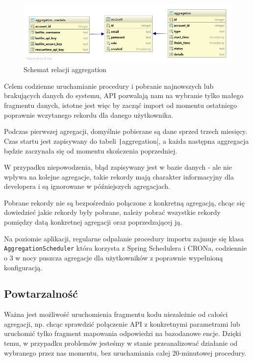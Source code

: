 \documentclass[openright]{xmgr}
\begin{document}
            \begin{figure}
                \centering
                \includegraphics[width=\textwidth]{fig/db-aggregation.png}
                \caption{Schemat relacji aggregation}
                \label{fig:db-aggregation}
            \end{figure}

            Celem codzienne uruchamianie procedury i pobranie najnowszych lub brakujących danych do systemu,
            API pozwalają nam na wybranie tylko małego fragmentu danych, istotne jest więc by zacząć import
            od momentu ostatniego poprawnie wczytanego rekordu dla danego użytkownika.

            Podczas pierwszej agregacji, domyślnie pobierane są dane sprzed trzech miesięcy.
            Czas startu jest zapisywany do tabeli \texttt|aggregation|,
            a każda następna aggregacja będzie zaczynała się od momentu skończenia poprzedniej.

            W przypadku niepowodzenia, błąd zapisywany jest w bazie danych - ale nie wpływa na kolejne agregacje,
            takie rekordy mają charakter informacyjny dla developera i są ignorowane w późniejszych agregacjach.

            Pobrane rekordy nie są bezpośrednio połączone z konkretną agregacją,
            chcąc się dowiedzieć jakie rekordy były pobrane, należy pobrać wszystkie rekordy pomiędzy datą konkretnej agregacji oraz poprzedzającej ją.

            Na poziomie aplikacji, regularne odpalanie procedury importu zajmuje się klasa \texttt{AggregationScheduler}
            która korzysta z Spring Schedulera i CRONa, codziennie o 3 w nocy puszcza agregacje dla użytkowników z poprawnie wypełnioną konfiguracją.

        \subsection*{Powtarzalność}

            Ważna jest możliwość uruchomienia fragmentu kodu niezależnie od całości agregacji, np. chcąc sprawdzić połączenie API z konkretnymi parametrami
            lub uruchomić tylko fragment mapowania odpowiedzi na bazodanowe encje.
            Dzięki temu, w przypadku problemów jesteśmy w stanie przeanalizować działanie od wybranego przez nas momentu,
            bez uruchamiania całej 20-minutowej procedury.
\end{document}
